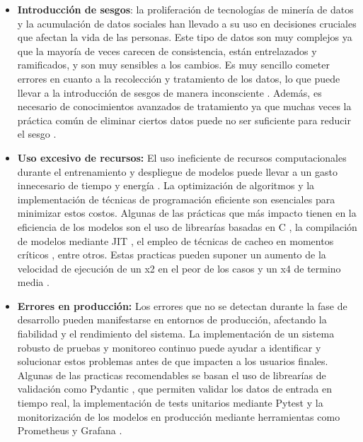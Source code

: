 \begin{itemize}
    \item \textbf{Introducción de sesgos}: la proliferación de tecnologías 
    de minería de datos y la acumulación de datos sociales han llevado a su uso en 
    decisiones cruciales que afectan la vida de las personas\cite{kamishima2012fairness}. Este tipo de datos son
    muy complejos ya que la mayoría de veces carecen de consistencia, están entrelazados
    y ramificados, y son muy sensibles a los cambios. Es muy sencillo cometer errores en cuanto
    a la recolección y tratamiento de los datos, lo que puede llevar a la introducción de sesgos
    de manera inconsciente \cite{galhotra2017fairness}. Además, es necesario de conocimientos
    avanzados de tratamiento ya que muchas veces la práctica común de eliminar ciertos datos
    puede no ser suficiente para reducir el sesgo \cite{kamishima2012fairness}.
    \item \textbf{Uso excesivo de recursos:} El uso ineficiente 
    de recursos computacionales durante el entrenamiento y despliegue de modelos puede llevar a un gasto 
    innecesario de tiempo y energía \cite{Jun2010Comparative}. La optimización de algoritmos y la implementación de 
    técnicas de programación eficiente son esenciales para minimizar estos costos. Algunas de
    las prácticas que más impacto tienen en la eficiencia de los modelos son el uso de librearías
    basadas en C \cite{1182968}, la compilación de modelos mediante JIT \cite{Aycock2003Brief}, el empleo de técnicas de cacheo en
    momentos críticos \cite{lruCache}, entre otros. Estas practicas pueden suponer un aumento de la velocidad de
    ejecución de un x2 en el peor de los casos y un x4 de termino media \cite{Jun2010Comparative}. 
    \item \textbf{Errores en producción:} Los errores que no se detectan durante 
    la fase de desarrollo pueden manifestarse en entornos de producción, afectando la fiabilidad 
    y el rendimiento del sistema. La implementación de un sistema robusto de pruebas y monitoreo 
    continuo puede ayudar a identificar y solucionar estos problemas antes de que impacten a los 
    usuarios finales. Algunas de las practicas recomendables se basan el uso de librearías de validación como
    Pydantic \cite{pydantic}, que permiten validar los datos de entrada en tiempo real,
    la implementación de tests unitarios mediante Pytest \cite{Pytest} y la monitorización
    de los modelos en producción mediante herramientas como Prometheus \cite{prometheus} y Grafana \cite{grafana}.

\end{itemize}

\pagebreak